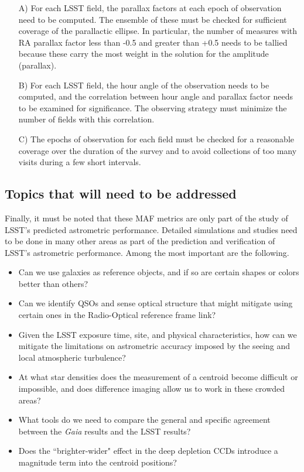 \begin{itemize}
\item[A)] For each LSST field, the parallax factors at each epoch of
observation need to be computed.  The ensemble of these must be checked for
sufficient coverage of the parallactic ellipse.  In particular, the number of
measures with RA parallax factor less than -0.5 and greater than +0.5
needs to be tallied because these carry the most weight in the solution
for the amplitude (parallax).
\item[B)] For each LSST field, the hour angle of the observation needs to be
computed, and the correlation between hour angle and parallax factor
needs to be examined for significance.  The observing strategy must minimize
the number of fields with this correlation.
\item[C)] The epochs of observation for each field must be checked for a
reasonable coverage over the duration of the survey and to avoid
collections of too many visits during a few short intervals.
\end{itemize}

\subsection{Topics that will need to be addressed}
\label{sec:keyword:MW_Astrometry_furtherwork}

Finally, it must be noted that these MAF metrics are only part of the
study of LSST's predicted astrometric performance.  Detailed simulations
and studies need to be done in many other areas as part of the
prediction and verification of LSST's astrometric performance.  Among
the most important are the following.

\begin{itemize}
\item Can we use galaxies as reference objects, and if so are certain
shapes or colors better than others?
\item Can we identify QSOs and sense optical structure that might
mitigate using certain ones in the Radio-Optical reference frame link?
\item Given the LSST exposure time, site, and physical characteristics,
how can we mitigate the limitations on astrometric accuracy imposed
by the seeing and local atmospheric turbulence?
\item At what star densities does the measurement of a centroid become
difficult or impossible, and does difference imaging allow us to work
in these crowded areas?
\item What tools do we need to compare the general and specific agreement
between the {\it Gaia} results and the LSST results?
\item Does the ``brighter-wider" effect in the deep depletion CCDs introduce
a magnitude term into the centroid positions?
\end{itemize}

\navigationbar

